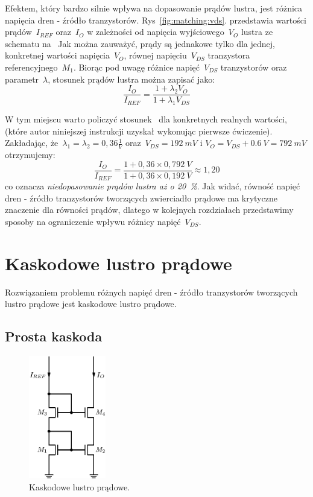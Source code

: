 \documentclass[twoside,pl,final]{labman}
\begin{document}
Efektem, który bardzo silnie wpływa na dopasowanie prądów lustra,
jest różnica napięcia dren - źródło tranzystorów.
Rys~\ref{fig:matching:vds}. przedstawia wartości prądów~$I_{REF}$
oraz~$I_O$ w zależności od napięcia wyjściowego~$V_O$
lustra ze schematu na~
Jak można zauważyć, prądy są jednakowe tylko dla jednej,
konkretnej wartości napięcia~$V_O$,
równej napięciu~$V_{DS}$ tranzystora referencyjnego~$M_1$.
Biorąc pod uwagę różnice napięć~$V_{DS}$ tranzystorów
oraz parametr~$\lambda$, stosunek prądów lustra można zapisać jako:
\begin{equation}
  \frac{I_O}{I_{REF}} = \frac{1 + \lambda_2 V_{O}}{1 + \lambda_1 V_{DS}}
  \label{eqn:matching:vds}
\end{equation}

W tym miejscu warto policzyć stosunek~
dla konkretnych realnych wartości, (które autor niniejszej instrukcji uzyskał
wykonując pierwsze ćwiczenie).
Zakładając, że~$\lambda_1 = \lambda_2 = 0,36 \frac{1}{V}$ oraz~$V_{DS} = 192~mV$
i $V_O = V_{DS} + 0.6~V = 792~mV$ otrzymujemy:
\begin{equation}
  \frac{I_O}{I_{REF}} = \frac{1 + 0,36 \times 0,792~V}
    {1 + 0,36 \times 0,192~V} \approx 1,20
  \label{eqn:matching:result}
\end{equation}
co oznacza \emph{niedopasowanie prądów lustra aż o 20~\%}.
Jak widać, równość napięć dren - źródło tranzystorów tworzących zwierciadło
prądowe ma krytyczne znaczenie dla równości prądów,
dlatego w kolejnych rozdziałach przedstawimy sposoby
na ograniczenie wpływu różnicy napięć~$V_{DS}$.

\section{Kaskodowe lustro prądowe}
\label{cascode}
Rozwiązaniem problemu różnych napięć dren - źródło tranzystorów
tworzących lustro prądowe jest kaskodowe lustro prądowe.

\subsection{Prosta kaskoda}
\label{cascode:simple}

\begin{figure}[!htbp]
  \centering
  \includegraphics[width=0.3\textwidth]{cascode_simple}
  \caption{Kaskodowe lustro prądowe.}
  \label{fig:cascode:simple}
\end{figure}
\end{document}

